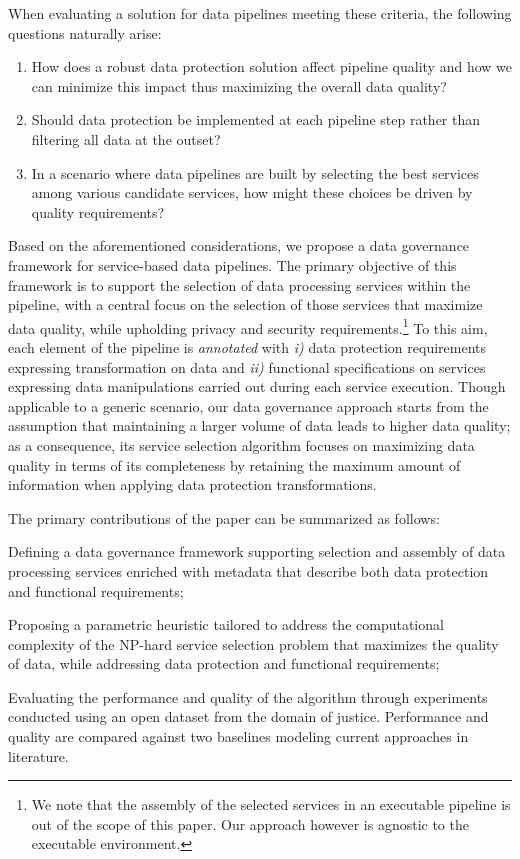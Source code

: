 When evaluating a solution {\color{OurColor}for data pipelines} meeting these criteria, the following questions naturally arise:
\begin{enumerate}
\item {\color{OurColor}How does a robust data protection solution affect pipeline quality and how we can minimize this impact thus maximizing the overall data quality?}
\item Should data protection be implemented at each pipeline step rather than filtering all data at the outset? 
\item {\color{OurColor}In a scenario where data pipelines are built by selecting the best services among various candidate services, how might these choices be driven by quality requirements?}
\end{enumerate}

Based on the aforementioned considerations, we propose a data governance framework for {\color{OurColor}service-based data pipelines}. %
The primary objective of this framework is to support the selection of data processing services within the pipeline, with a central focus on the selection of those services that {\color{OurColor}maximize} data quality, while upholding privacy and security requirements.\footnote{{\color{OurColor}We note that the assembly of the selected services in an executable pipeline is out of the scope of this paper. Our approach however is agnostic to the executable environment.}} 
To this aim, each element of the pipeline is \textit{annotated} with \emph{i)} data protection requirements expressing transformation on data and \emph{ii)} functional specifications on services expressing data manipulations carried out during each service execution. 
Though applicable to a generic scenario, our data governance approach starts from the assumption that maintaining a larger volume of data leads to higher data quality; as a consequence, its service selection algorithm focuses on maximizing data quality {\color{OurColor}in terms of its completeness} by retaining the maximum amount of information when applying data protection transformations. 

The primary contributions of the paper can be summarized as follows:
\begin{enumerate*}
  \item Defining a data governance framework supporting selection and assembly of data processing services enriched with metadata that describe both data protection and functional requirements;
  \item Proposing a parametric heuristic tailored to address the computational complexity of the NP-hard service selection problem {\color{OurColor}that maximizes the quality of data, while addressing data protection and functional requirements};
  \item Evaluating the performance and quality of the algorithm through experiments conducted using {\color{OurColor}an open dataset from the domain of justice. Performance and quality are compared against two baselines modeling current approaches in literature.}
\end{enumerate*}


